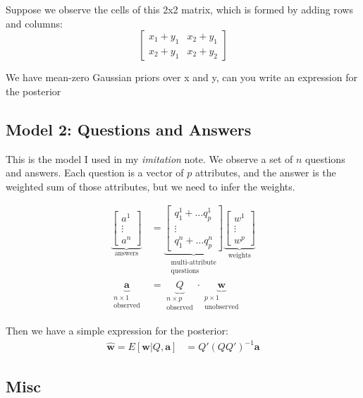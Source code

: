 \documentclass[
  10pt,
  letterpaper,
  DIV=11,
  numbers=noendperiod,
  oneside]{scrartcl}
\newcommand{\bm}[1]{\boldsymbol{#1}}
\newcommand{\ut}[2]{\underbrace{#1}_{\text{#2}}}
\newcommand{\utt}[3]{\underbrace{#1}_{\substack{\text{#2}\\\text{#3}}}}
\begin{document}
Suppose we observe the cells of this 2x2 matrix, which is formed by
adding rows and columns: \[\begin{bmatrix}
   x_1 + y_1 & x_2 + y_1 \\
   x_2 + y_1 & x_2 + y_2
\end{bmatrix}\]

We have mean-zero Gaussian priors over x and y, can you write an
expression for the posterior

\subsection{Model 2: Questions and
Answers}\label{model-2-questions-and-answers}

This is the model I used in my \emph{imitation} note. We observe a set
of \(n\) questions and answers. Each question is a vector of \(p\)
attributes, and the answer is the weighted sum of those attributes, but
we need to infer the weights.

\[\begin{aligned}
      \ut{\begin{bmatrix}a^1 \\ \vdots \\ a^n\end{bmatrix}}{answers}
         &= \utt{\begin{bmatrix}q_1^1 + \ldots q_p^1 \\ \vdots \\ q_1^n + \ldots q_p^n\end{bmatrix}}{multi-attribute}{questions}
         \ut{\begin{bmatrix}w^1 \\ \vdots \\ w^p\end{bmatrix}}{weights}\\
      \utt{\bm{a}}{$n\times1$}{observed}        &= 
      \utt{Q}{$n\times p$}{observed}\cdot \utt{\bm{w}}{$p\times1$}{unobserved}
   \end{aligned}
\]

Then we have a simple expression for the posterior: \[\begin{aligned}
   \hat{\bm{w}}=E[\bm{w}|Q,\bm{a}] &= Q'(QQ')^{-1}\bm{a}
\end{aligned}
\]

\subsection{Misc}\label{misc}
\end{document}
